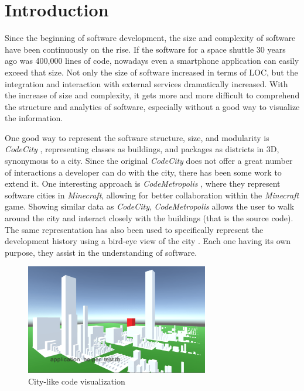 \documentclass[conference]{IEEEtran}
\begin{document}
\section{Introduction}
Since the beginning of software development, the size and complexity of software have been continuously on the rise.
If the software for a space shuttle 30 years ago was 400,000 lines of code, nowadays even a smartphone application can easily exceed that size.
Not only the size of software increased in terms of LOC, but the integration and interaction with external services dramatically increased.
With the increase of size and complexity, it gets more and more difficult to comprehend the structure and analytics of software, especially without a good way to visualize the information.

One good way to represent the software structure, size, and modularity is \textit{CodeCity} \cite{Wettel:2011:SSC:1985793.1985868}, representing classes as buildings, and packages as districts in 3D, synonymous to a city.
Since the original \textit{CodeCity} does not offer a great number of interactions a developer can do with the city, there has been some work to extend it.
One interesting approach is \textit{CodeMetropolis} \cite{6648194}, where they represent software cities in \textit{Minecraft}, allowing for better collaboration within the \textit{Minecraft} game.
Showing similar data as \textit{CodeCity}, \textit{CodeMetropolis} allows the user to walk around the city and interact closely with the buildings (that is the source code).
The same representation has also been used to specifically represent the development history using a bird-eye view of the city \cite{Steinbruckner:2010:RDH:1879211.1879239}.
Each one having its own purpose, they assist in the understanding of software.

\begin{figure}[h]
\centering
\includegraphics[width=8cm]{NewROCAT.pdf}
\caption{City-like code visualization}
\label{figure:new-Rocat}
\end{figure}
\end{document}
